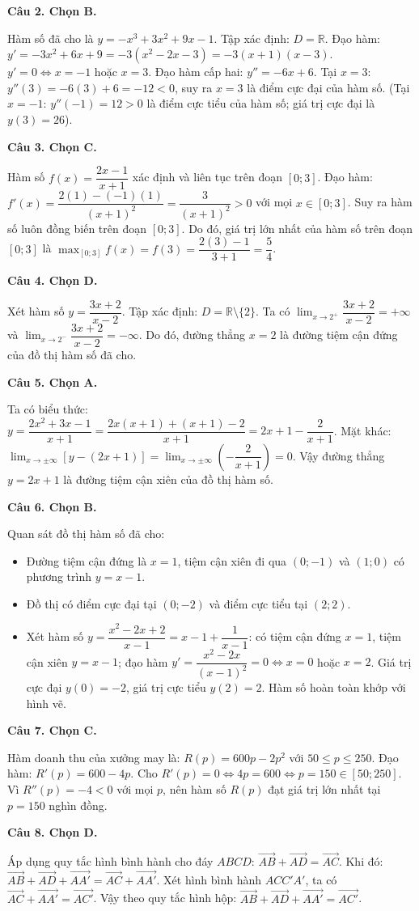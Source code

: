 \documentclass[12pt,a4paper]{article}
\newcommand{\loigiai}[1]{\par\medskip\Needspace{4\baselineskip}\noindent\textbf{#1}\par\nobreak}
\begin{document}
\loigiai{Câu 2. Chọn B.}
Hàm số đã cho là $y=-x^3+3x^2+9x-1$.
Tập xác định: $D=\mathbb{R}$.
Đạo hàm: $y'=-3x^2+6x+9=-3(x^2-2x-3)=-3(x+1)(x-3)$.
$y'=0 \iff x=-1$ hoặc $x=3$.
Đạo hàm cấp hai: $y''=-6x+6$.
Tại $x=3$: $y''(3)=-6(3)+6=-12<0$, suy ra $x=3$ là điểm cực đại của hàm số.
(Tại $x=-1$: $y''(-1)=12>0$ là điểm cực tiểu của hàm số; giá trị cực đại là $y(3)=26$).

\loigiai{Câu 3. Chọn C.}
Hàm số $f(x)=\dfrac{2x-1}{x+1}$ xác định và liên tục trên đoạn $[0;3]$.
Đạo hàm: $f'(x)=\dfrac{2(1)-(-1)(1)}{(x+1)^2}=\dfrac{3}{(x+1)^2}>0$ với mọi $x\in[0;3]$.
Suy ra hàm số luôn đồng biến trên đoạn $[0;3]$.
Do đó, giá trị lớn nhất của hàm số trên đoạn $[0;3]$ là $\max_{[0;3]} f(x)=f(3)=\dfrac{2(3)-1}{3+1}=\dfrac{5}{4}$.

\loigiai{Câu 4. Chọn D.}
Xét hàm số $y=\dfrac{3x+2}{x-2}$.
Tập xác định: $D=\mathbb{R}\setminus\{2\}$.
Ta có $\lim_{x\to 2^+} \dfrac{3x+2}{x-2}=+\infty$ và $\lim_{x\to 2^-} \dfrac{3x+2}{x-2}=-\infty$.
Do đó, đường thẳng $x=2$ là đường tiệm cận đứng của đồ thị hàm số đã cho.

\loigiai{Câu 5. Chọn A.}
Ta có biểu thức:
$y=\dfrac{2x^2+3x-1}{x+1} = \dfrac{2x(x+1) + (x+1) - 2}{x+1} = 2x+1 - \dfrac{2}{x+1}$.
Mặt khác:
$\lim_{x\to\pm\infty} [y - (2x+1)] = \lim_{x\to\pm\infty} \left(-\dfrac{2}{x+1}\right) = 0$.
Vậy đường thẳng $y=2x+1$ là đường tiệm cận xiên của đồ thị hàm số.

\loigiai{Câu 6. Chọn B.}
Quan sát đồ thị hàm số đã cho:
\begin{itemize}[leftmargin=*]
\item Đường tiệm cận đứng là $x=1$, tiệm cận xiên đi qua $(0;-1)$ và $(1;0)$ có phương trình $y=x-1$.
\item Đồ thị có điểm cực đại tại $(0;-2)$ và điểm cực tiểu tại $(2;2)$.
\item Xét hàm số $y=\dfrac{x^2-2x+2}{x-1} = x-1+\dfrac{1}{x-1}$:
có tiệm cận đứng $x=1$, tiệm cận xiên $y=x-1$; đạo hàm $y'=\dfrac{x^2-2x}{(x-1)^2}=0 \iff x=0$ hoặc $x=2$.
Giá trị cực đại $y(0)=-2$, giá trị cực tiểu $y(2)=2$. Hàm số hoàn toàn khớp với hình vẽ.
\end{itemize}

\loigiai{Câu 7. Chọn C.}
Hàm doanh thu của xưởng may là:
$R(p) = 600p - 2p^2$ với $50 \le p \le 250$.
Đạo hàm: $R'(p) = 600 - 4p$.
Cho $R'(p) = 0 \iff 4p = 600 \iff p = 150 \in [50;250]$.
Vì $R''(p) = -4 < 0$ với mọi $p$, nên hàm số $R(p)$ đạt giá trị lớn nhất tại $p = 150$ nghìn đồng.

\loigiai{Câu 8. Chọn D.}
Áp dụng quy tắc hình bình hành cho đáy $ABCD$: $\vec{AB} + \vec{AD} = \vec{AC}$.
Khi đó:
$\vec{AB} + \vec{AD} + \vec{AA'} = \vec{AC} + \vec{AA'}$.
Xét hình bình hành $ACC'A'$, ta có $\vec{AC} + \vec{AA'} = \vec{AC'}$.
Vậy theo quy tắc hình hộp: $\vec{AB} + \vec{AD} + \vec{AA'} = \vec{AC'}$.
\end{document}
